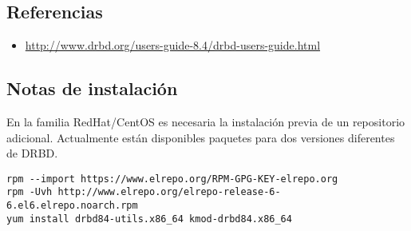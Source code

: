 \subsection{Referencias}

\begin{itemize}
	\item \url{http://www.drbd.org/users-guide-8.4/drbd-users-guide.html}
\end{itemize}


\subsection{Notas de instalación}
En la familia RedHat/CentOS es necesaria la instalación previa de un repositorio adicional. Actualmente están disponibles paquetes para dos versiones diferentes de DRBD. 
\begin{lstlisting}
rpm --import https://www.elrepo.org/RPM-GPG-KEY-elrepo.org
rpm -Uvh http://www.elrepo.org/elrepo-release-6-6.el6.elrepo.noarch.rpm
yum install drbd84-utils.x86_64 kmod-drbd84.x86_64
\end{lstlisting} 

